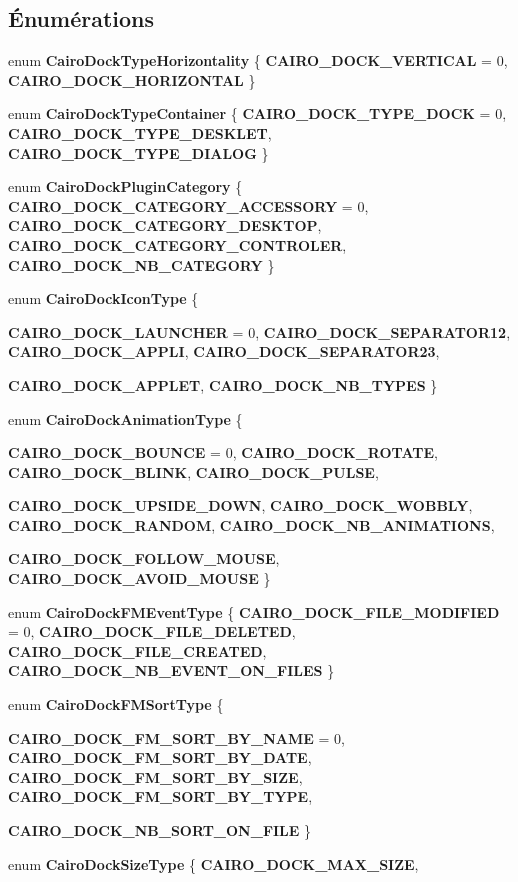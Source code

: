 \subsection*{Énumérations}
\begin{CompactItemize}
\item 
enum {\bf CairoDockTypeHorizontality} \{ {\bf CAIRO\_\-DOCK\_\-VERTICAL} =  0, 
{\bf CAIRO\_\-DOCK\_\-HORIZONTAL}
 \}
\item 
enum {\bf CairoDockTypeContainer} \{ {\bf CAIRO\_\-DOCK\_\-TYPE\_\-DOCK} =  0, 
{\bf CAIRO\_\-DOCK\_\-TYPE\_\-DESKLET}, 
{\bf CAIRO\_\-DOCK\_\-TYPE\_\-DIALOG}
 \}
\item 
enum {\bf CairoDockPluginCategory} \{ {\bf CAIRO\_\-DOCK\_\-CATEGORY\_\-ACCESSORY} = 0, 
{\bf CAIRO\_\-DOCK\_\-CATEGORY\_\-DESKTOP}, 
{\bf CAIRO\_\-DOCK\_\-CATEGORY\_\-CONTROLER}, 
{\bf CAIRO\_\-DOCK\_\-NB\_\-CATEGORY}
 \}
\item 
enum {\bf CairoDockIconType} \{ \par
{\bf CAIRO\_\-DOCK\_\-LAUNCHER} =  0, 
{\bf CAIRO\_\-DOCK\_\-SEPARATOR12}, 
{\bf CAIRO\_\-DOCK\_\-APPLI}, 
{\bf CAIRO\_\-DOCK\_\-SEPARATOR23}, 
\par
{\bf CAIRO\_\-DOCK\_\-APPLET}, 
{\bf CAIRO\_\-DOCK\_\-NB\_\-TYPES}
 \}
\item 
enum {\bf CairoDockAnimationType} \{ \par
{\bf CAIRO\_\-DOCK\_\-BOUNCE} =  0, 
{\bf CAIRO\_\-DOCK\_\-ROTATE}, 
{\bf CAIRO\_\-DOCK\_\-BLINK}, 
{\bf CAIRO\_\-DOCK\_\-PULSE}, 
\par
{\bf CAIRO\_\-DOCK\_\-UPSIDE\_\-DOWN}, 
{\bf CAIRO\_\-DOCK\_\-WOBBLY}, 
{\bf CAIRO\_\-DOCK\_\-RANDOM}, 
{\bf CAIRO\_\-DOCK\_\-NB\_\-ANIMATIONS}, 
\par
{\bf CAIRO\_\-DOCK\_\-FOLLOW\_\-MOUSE}, 
{\bf CAIRO\_\-DOCK\_\-AVOID\_\-MOUSE}
 \}
\item 
enum {\bf CairoDockFMEventType} \{ {\bf CAIRO\_\-DOCK\_\-FILE\_\-MODIFIED} = 0, 
{\bf CAIRO\_\-DOCK\_\-FILE\_\-DELETED}, 
{\bf CAIRO\_\-DOCK\_\-FILE\_\-CREATED}, 
{\bf CAIRO\_\-DOCK\_\-NB\_\-EVENT\_\-ON\_\-FILES}
 \}
\item 
enum {\bf CairoDockFMSortType} \{ \par
{\bf CAIRO\_\-DOCK\_\-FM\_\-SORT\_\-BY\_\-NAME} = 0, 
{\bf CAIRO\_\-DOCK\_\-FM\_\-SORT\_\-BY\_\-DATE}, 
{\bf CAIRO\_\-DOCK\_\-FM\_\-SORT\_\-BY\_\-SIZE}, 
{\bf CAIRO\_\-DOCK\_\-FM\_\-SORT\_\-BY\_\-TYPE}, 
\par
{\bf CAIRO\_\-DOCK\_\-NB\_\-SORT\_\-ON\_\-FILE}
 \}
\item 
enum {\bf CairoDockSizeType} \{ {\bf CAIRO\_\-DOCK\_\-MAX\_\-SIZE}, 

\end{CompactItemize}
